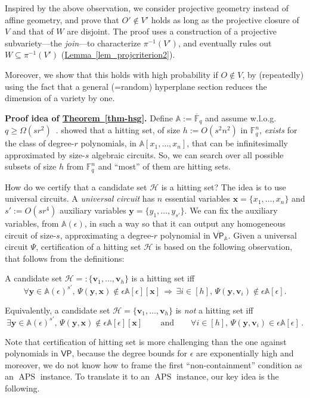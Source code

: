 \documentclass[11pt]{article}
\numberwithin{equation}{section}
\theoremstyle{definition}
\theoremstyle{plain}
\newcommand{\cclass}[1]{\textsf{#1}}
\newcommand{\expref}[2]{\hyperref[#2]{#1~\ref{#2}}}
\newcommand{\F}{\mathbb{F}}
\newcommand{\calH}{\mathcal{H}}
\newcommand{\aff}{\mathbb{A}}
\newcommand{\ol}[1]{\overline{#1}}
\newcommand{\VP}{\cclass{VP}\xspace}  %
\newcommand{\VPbar}{\overline{\VP}\xspace}  %
\DeclareMathOperator{\APS}{\mathrm{APS}\xspace} %
\begin{document}
Inspired by the above observation, we consider projective geometry instead of affine geometry, and prove that $O'\not\in V'$ holds as long as the projective closure of $V$ and that of $W$ are disjoint. The proof uses a construction of a projective subvariety---the \emph{join}---to characterize $\pi^{-1}(V')$, and eventually rules out $W\subseteq \pi^{-1}(V')$ (\expref{Lemma}{lem_projcriterion2}).

Moreover, we show that this holds with high probability if 
%
$O\not\in V$, by (repeatedly) using the fact that a general (=random) %
hyperplane section reduces the dimension of a variety by one.

\smallskip\noindent
\textbf{Proof idea of \expref{Theorem}{thm-hsg}.} 
Define $\aff:=\ol{\F}_q$ and assume w.l.o.g.\ $q\ge\Omega(sr^{2})$~\cite{AL86}.
\cite[Theorem~4.4]{heintz1980testing} showed that a hitting set, of size $h:= O(s^2n^2)$ in $\F_q^n$, \emph{exists} for the class of degree-$r$ polynomials, in $\aff[x_1,\dots,x_n]$, that can be infinitesimally approximated by size-$s$ algebraic circuits. So, we can search over all possible subsets of size $h$ from $\F_q^n$ and ``most'' of them are hitting sets.

How do we certify that a candidate set $\calH$ is a hitting set? The idea is to use universal circuits. A \emph{universal circuit} has $n$ essential variables $\mathbf x=\{x_1,\ldots,x_n\}$ and $s':=O(sr^4)$ auxiliary variables $\mathbf y= \{y_1,\ldots, y_{s'}\}$. We can fix the auxiliary variables, from $\aff(\epsilon)$, in such a way so that it can output any homogeneous circuit of size-$s$, approximating a degree-$r$ polynomial in
%
$\VPbar_\aff$.   %
Given a universal circuit $\Psi$, certification of a hitting set $\calH$ is based on the following observation, that follows from the definitions: 

%
A candidate set %
$\calH=: \{\mathbf v_1,\ldots, \mathbf v_h\}$ is a hitting set iff
\[
  \forall \mathbf y\in \aff(\epsilon)^{s'}, \,\Psi(\mathbf{y,x})\notin \epsilon\aff[\epsilon][\mathbf x]  \,\Rightarrow\, \exists i\in[h],\,  \Psi(\mathbf y, \mathbf v_i)\notin \epsilon\aff[\epsilon].
\]

\smallskip
%
Equivalently, a candidate set %
$\calH= \{\mathbf v_1,\ldots, \mathbf v_h\}$ is \emph{not} a hitting set iff
\[
  \exists \mathbf y\in \aff(\epsilon)^{s'}, \,\Psi(\mathbf{y,x})\notin \epsilon\aff[\epsilon][\mathbf x]\,\qquad\text{and}\qquad  \forall i\in[h],\,  \Psi(\mathbf y, \mathbf v_i)\in \epsilon\aff[\epsilon]\,.
\]

\smallskip
Note that certification of hitting set is more challenging than the one against polynomials in
%
$\VP$,  %
because the degree bounds for $\epsilon$ are exponentially high and moreover, we do not know how to frame the first ``non-containment'' condition as an $\APS$ instance. To translate it to an $\APS$ instance, our key idea is the following. 
\end{document}
